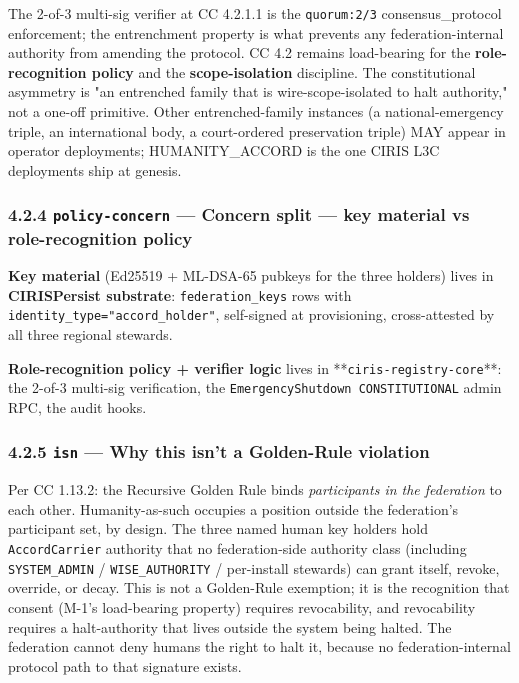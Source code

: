 \documentclass[11pt]{article}
\begin{document}
The 2-of-3 multi-sig verifier at CC 4.2.1.1 is the \texttt{quorum:2/3} consensus\_protocol enforcement; the entrenchment property is what prevents any federation-internal authority from amending the protocol. CC 4.2 remains load-bearing for the \textbf{role-recognition policy} and the \textbf{scope-isolation} discipline. The constitutional asymmetry is "an entrenched family that is wire-scope-isolated to halt authority," not a one-off primitive. Other entrenched-family instances (a national-emergency triple, an international body, a court-ordered preservation triple) MAY appear in operator deployments; HUMANITY\_ACCORD is the one CIRIS L3C deployments ship at genesis.


\subsubsection*{4.2.4 \texttt{policy-concern} — Concern split — key material vs role-recognition policy}


\textbf{Key material} (Ed25519 + ML-DSA-65 pubkeys for the three holders) lives in \textbf{CIRISPersist substrate}: \texttt{federation\_keys} rows with \texttt{identity\_type="accord\_holder"}, self-signed at provisioning, cross-attested by all three regional stewards.


\textbf{Role-recognition policy + verifier logic} lives in **\texttt{ciris-registry-core}**: the 2-of-3 multi-sig verification, the \texttt{EmergencyShutdown CONSTITUTIONAL} admin RPC, the audit hooks.


\subsubsection*{4.2.5 \texttt{isn} — Why this isn't a Golden-Rule violation}


Per CC 1.13.2: the Recursive Golden Rule binds \textit{participants in the federation} to each other. Humanity-as-such occupies a position outside the federation's participant set, by design. The three named human key holders hold \texttt{AccordCarrier} authority that no federation-side authority class (including \texttt{SYSTEM\_ADMIN} / \texttt{WISE\_AUTHORITY} / per-install stewards) can grant itself, revoke, override, or decay. This is not a Golden-Rule exemption; it is the recognition that consent (M-1's load-bearing property) requires revocability, and revocability requires a halt-authority that lives outside the system being halted. The federation cannot deny humans the right to halt it, because no federation-internal protocol path to that signature exists.
\end{document}
